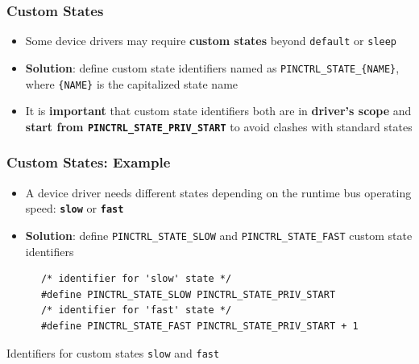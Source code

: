 \documentclass[handout]{beamer}
\begin{document}
\begin{frame}
  \frametitle{Custom States}

  \begin{itemize}
    \item<1-> Some device drivers may require \textbf{custom states} beyond
          \texttt{default} or \texttt{sleep}
    \item<2-> \textbf{Solution}: define custom state identifiers named as
          \texttt{PINCTRL\_STATE\_\{NAME\}}, where \texttt{\{NAME\}} is the
          capitalized state name
    \item<3-> It is \textbf{important} that custom state identifiers both are in
          \textbf{driver's scope} and
          \textbf{start from \texttt{PINCTRL\_STATE\_PRIV\_START}} to avoid
          clashes with standard states
  \end{itemize}
\end{frame}

\begin{frame}[fragile]
  \frametitle{Custom States: Example}

  \begin{itemize}
    \item<1-> A device driver needs different states depending on the runtime
          bus operating speed: \textbf{\texttt{slow}} or \textbf{\texttt{fast}}
    \item<2-> \textbf{Solution}: define \texttt{PINCTRL\_STATE\_SLOW} and
          \texttt{PINCTRL\_STATE\_FAST} custom state identifiers
  \end{itemize}

  \begin{listing}[H]
    \begin{verbatim}
      /* identifier for 'slow' state */
      #define PINCTRL_STATE_SLOW PINCTRL_STATE_PRIV_START
      /* identifier for 'fast' state */
      #define PINCTRL_STATE_FAST PINCTRL_STATE_PRIV_START + 1
    \end{verbatim}
    \caption{Identifiers for custom states \texttt{slow} and \texttt{fast}}
  \end{listing}
\end{frame}
\end{document}
